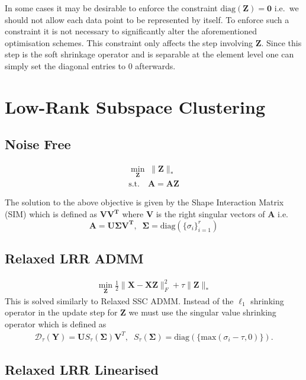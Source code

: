 \documentclass{article}
\begin{document}
In some cases it may be desirable to enforce the constraint $\textrm{diag}(\mathbf Z) = \mathbf 0$ i.e.\ we should not allow each data point to be represented by itself. To enforce such a constraint it is not necessary to significantly alter the aforementioned optimisation schemes. This constraint only affects the step involving $\mathbf Z$. Since this step is the soft shrinkage operator and is separable at the element level one can simply set the diagonal entries to $0$ afterwards.

\newpage
\section{Low-Rank Subspace Clustering}

\subsection{Noise Free}

\begin{align}
\min_{\mathbf{Z}} \;  \| \mathbf{Z} \|_* \\
\text{s.t.} \quad \mathbf{A = AZ} \nonumber
\end{align}

The solution to the above objective is given by the Shape Interaction Matrix (SIM) which is defined as $\mathbf{V  V^T}$ where $\mathbf V$ is the right singular vectors of $\mathbf A$ i.e.\
\[
\mathbf{A = U \Sigma V^T}, \;\; \mathbf \Sigma = \text{diag}(\{\sigma_i\}_{i=1}^r)
\]

\subsection{Relaxed LRR ADMM}

\begin{align}
\min_{\mathbf Z} \frac12\|\mathbf X - \mathbf X\mathbf Z\|^2_F + \tau \|\mathbf Z\|_{*}
\end{align}
This is solved similarly to Relaxed SSC ADMM. Instead of the $\ell_1$ shrinking operator in the update step for $\mathbf Z$ we must use the singular value shrinking operator which is defined as 
\begin{align}
\mathcal D_{\tau}(\mathbf Y) = \mathbf U S_{\tau}(\mathbf \Sigma) \mathbf V^T, \;\; S_{\tau}(\mathbf \Sigma) = \text{diag}(\{\text{max}(\sigma_i - \tau, 0)\}).
\end{align}

\subsection{Relaxed LRR Linearised}
\end{document}
